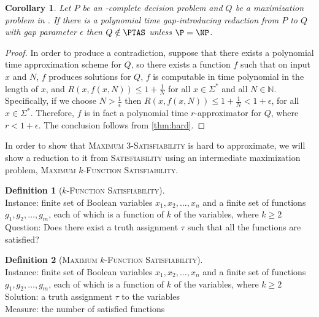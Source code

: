 \documentclass[]{article}
\theoremstyle{plain}
\newtheorem{corollary}{Corollary}
\theoremstyle{definition}
\newtheorem{definition}{Definition}
\newenvironment{instance}{\\Instance:}{}
\newenvironment{measure}{\\Measure:}{}
\newenvironment{solution}{\\Solution:}{}
\newenvironment{question}{\\Question:}{}
\begin{document}
\begin{corollary}\label{cor:notinptas}
  Let $P$ be an \NP-complete decision problem and $Q$ be a maximization problem in \NPO.
  If there is a polynomial time gap-introducing reduction from $P$ to $Q$ with gap parameter $\epsilon$ then $Q \notin \PTAS$ unless $\P = \NP$.
\end{corollary}
\begin{proof}
  In order to produce a contradiction, suppose that there exists a polynomial time approximation scheme for $Q$, so there exists a function $f$ such that on input $x$ and $N$, $f$ produces solutions for $Q$, $f$ is computable in time polynomial in the length of $x$, and $R(x, f(x, N)) \leq 1 + \frac{1}{N}$ for all $x \in \Sigma^*$ and all $N \in \mathbb{N}$.
  Specifically, if we choose $N > \frac{1}{\epsilon}$ then $R(x, f(x, N)) \leq 1 + \frac{1}{N} < 1 + \epsilon$, for all $x \in \Sigma^*$.
  Therefore, $f$ is in fact a polynomial time $r$-approximator for $Q$, where $r < 1 + \epsilon$.
  The conclusion follows from \autoref{thm:hard}.
\end{proof}

In order to show that \textsc{Maximum 3-Satisfiability} is hard to approximate, we will show a reduction to it from \textsc{Satisfiability} using an intermediate maximization problem, \textsc{Maximum $k$-Function Satisfiability}.

\begin{definition}[\textsc{$k$-Function Satisfiability}]
  \mbox{}
  \begin{instance}
    finite set of Boolean variables $x_1, x_2, \ldots, x_n$ and a finite set of  functions $g_1, g_2, \ldots, g_m$, each of which is a function of $k$ of the variables, where $k \geq 2$
  \end{instance}
  \begin{question}
    Does there exist a truth assignment $\tau$ such that all the functions are satisfied?
  \end{question}
\end{definition}

\begin{definition}[\textsc{Maximum $k$-Function Satisfiability}]
  \mbox{}
  \begin{instance}
    finite set of Boolean variables $x_1, x_2, \ldots, x_n$ and a finite set of  functions $g_1, g_2, \ldots, g_m$, each of which is a function of $k$ of the variables, where $k \geq 2$
  \end{instance}
  \begin{solution}
    a truth assignment $\tau$ to the variables
  \end{solution}
  \begin{measure}
   the number of satisfied functions
  \end{measure}
\end{definition}
\end{document}
